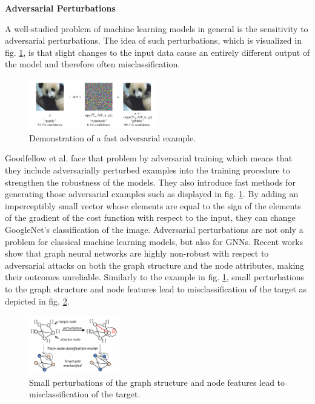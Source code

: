 \documentclass[a4paper,preprint]{sig-alternate}
\begin{document}
\textbf{Adversarial Perturbations}\newline

A well-studied problem of machine learning models in general is the sensitivity to adversarial perturbations.\cite{Goodfellow_2015}
The idea of such perturbations, which is visualized in fig. \ref{fig:adversarial_example}, is that slight changes to the input data
cause an entirely different output of the model and therefore often misclassification.

\begin{figure}[h]
    \centering
    \includegraphics[width=0.5\textwidth]{img/adversarial_example.png}
    \caption{Demonstration of a fast adversarial example. \cite{Goodfellow_2015}}
    \label{fig:adversarial_example}
\end{figure}

Goodfellow et al. \cite{Goodfellow_2015} face that problem by adversarial training which means that they include adversarially 
perturbed examples into the training procedure to strengthen the robustness of the models. They also introduce fast methods for generating 
those adversarial examples such as displayed in fig. \ref{fig:adversarial_example}. By adding an imperceptibly small vector whose elements
are equal to the sign of the elements of the gradient of the cost function with respect to the input, they can change GoogleNet's classification
of the image.\cite{Goodfellow_2015}\newline
Adversarial perturbations are not only a problem for classical machine learning models, but also for GNNs.
Recent works show that graph neural networks are highly non-robust with respect to adversarial attacks on both the graph
structure and the node attributes, making their outcomes unreliable.\cite{Zuegner_2019}
Similarly to the example in fig. \ref{fig:adversarial_example}, small perturbations to the graph structure and node features lead to 
misclassification of the target as depicted in fig. \ref{fig:adversarial_GNN}.

\begin{figure}[h]
    \centering
    \includegraphics[width=0.35\textwidth]{img/adversarial_GNN.png}
    \caption{Small perturbations of the graph structure and node features lead to misclassification of the target. \cite{Zuegner_2018}}
    \label{fig:adversarial_GNN}
\end{figure}
\end{document}
